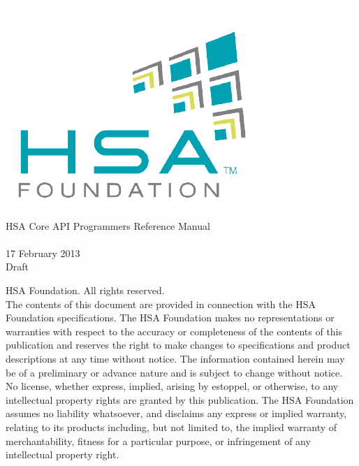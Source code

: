 \documentclass{book}
\begin{document}
\raggedright
\hypersetup{pageanchor=false,citecolor=blue}
\begin{titlepage}
\includegraphics[width=.5\textwidth]{foundation.png}
\vspace*{7cm}
\begin{center}
{\Large H\-S\-A Core API Programmers Reference Manual\\[1ex]\large
{} }\\
\vspace*{1cm}
\vspace*{0.5cm}
{\small 17 February 2013}\\
\vspace*{0.5cm}
{\small Draft}\\
\end{center}
\end{titlepage}
\thispagestyle{empty}
{ HSA Foundation. All rights reserved.\\}
The contents of this document are provided in connection with the
HSA Foundation specifications. The HSA Foundation makes no
representations or warranties with respect to the accuracy or
completeness of the contents of this publication and reserves the
right to make changes to specifications and product descriptions at
any time without notice. The information contained herein may be of
a preliminary or advance nature and is subject to change without
notice. No license, whether express, implied, arising by estoppel,
or otherwise, to any intellectual property rights are granted by
this publication. The HSA Foundation assumes no liability
whatsoever, and disclaims any express or implied warranty, relating
to its products including, but not limited to, the implied warranty
of merchantability, fitness for a particular purpose, or
infringement of any intellectual property right.
\clearpage
{}
\tableofcontents
{}
\clearpage

\setcounter{page}{1}
\end{document}
